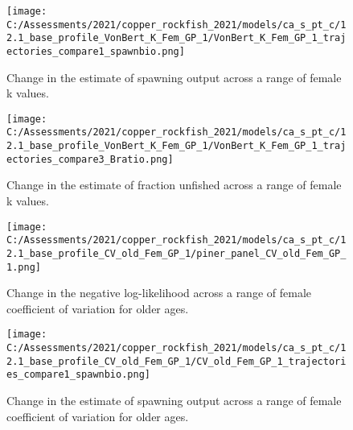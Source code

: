 \documentclass[11pt,
  english,
  a4paper,
]{article}
\begin{document}
\tagmcend\tagstructend


\begin{figure}
\centering
\texttt{[image: C:/Assessments/2021/copper\_rockfish\_2021/models/ca\_s\_pt\_c/12.1\_base\_profile\_VonBert\_K\_Fem\_GP\_1/VonBert\_K\_Fem\_GP\_1\_trajectories\_compare1\_spawnbio.png]}
\caption{Change in the estimate of spawning output across a range of female k values.\label{fig:k-ssb}}
\end{figure}

\tagmcend\tagstructend


\begin{figure}
\centering
\texttt{[image: C:/Assessments/2021/copper\_rockfish\_2021/models/ca\_s\_pt\_c/12.1\_base\_profile\_VonBert\_K\_Fem\_GP\_1/VonBert\_K\_Fem\_GP\_1\_trajectories\_compare3\_Bratio.png]}
\caption{Change in the estimate of fraction unfished across a range of female k values.\label{fig:k-depl}}
\end{figure}

\tagmcend\tagstructend


\begin{figure}
\centering
\texttt{[image: C:/Assessments/2021/copper\_rockfish\_2021/models/ca\_s\_pt\_c/12.1\_base\_profile\_CV\_old\_Fem\_GP\_1/piner\_panel\_CV\_old\_Fem\_GP\_1.png]}
\caption{Change in the negative log-likelihood across a range of female coefficient of variation for older ages.\label{fig:cv-profile}}
\end{figure}

\tagmcend\tagstructend


\begin{figure}
\centering
\texttt{[image: C:/Assessments/2021/copper\_rockfish\_2021/models/ca\_s\_pt\_c/12.1\_base\_profile\_CV\_old\_Fem\_GP\_1/CV\_old\_Fem\_GP\_1\_trajectories\_compare1\_spawnbio.png]}
\caption{Change in the estimate of spawning output across a range of female coefficient of variation for older ages.\label{fig:cv-ssb}}
\end{figure}
\end{document}
